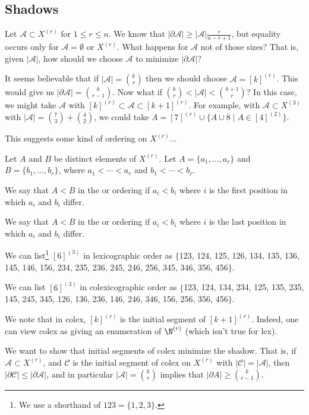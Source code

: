 \documentclass[a4paper]{scrartcl}
\newcommand{\A}{\mathcal{A}}
\begin{document}
\subsection{Shadows}

Let $\A \subset X^{(r)}$ for $1 \leq r \leq n$. We know that $|\partial \A| \geq |\A| \frac{r}{n - r + 1}$, but equality occurs only for $\A = \emptyset$ or $X^{(r)}$. What happens for $\A$ not of those sizes? That is, given $|\A|$, how should we choose $\A$ to minimize $|\partial \A|$?

It seems believable that if $|\A| = \binom{k}{r}$ then we should choose $\A = [k]^{(r)}$. This would give us $|\partial \A| = \binom{k}{r - 1}$. Now what if $\binom{k}{r} < |\A| < \binom{k + 1}{r}$? In this case, we might take $\A$ with $[k]^{(r)} \subset \A \subset [k+1]^{(r)}$. For example, with $\A \subset X^{(3)}$ with $|\A| = \binom{7}{3} + \binom{4}{2}$, we could take $A = [7]^{(r)} \cup \{A \cup 8 \mid A \in [4]^{(2)}\}$.

This suggests some kind of ordering on $X^{(r)}$...

\begin{definition}[Ordering $X^{(r)}$]
    Let $A$ and $B$ be distinct elements of $X^{(r)}$. Let $A = \{a_1, \dots, a_r\}$ and $B = \{b_1, \dots, b_r\}$, where $a_1 < \cdots < a_r$ and $b_1 < \cdots < b_r$.

    We say that $A < B$ in the  or  ordering if 
    $a_i < b_i$ where $i$ is the first position in which $a_i$ and $b_i$ differ.

    We say that $A < B$ in the  or  ordering if $a_i < b_i$ where $i$ is the last position in which $a_i$ and $b_i$ differ.
\end{definition}

\begin{example}
We can list\footnote{We use a shorthand of $123 = \{1, 2, 3\}$.} $[6]^{(3)}$ in lexicographic order as $\{$123, 124, 125, 126, 134, 135, 136, 145, 146, 156, 234, 235, 236, 245, 246, 256, 345, 346, 356, 456$\}$.
\end{example}

\begin{example}
We can list $[6]^{(3)}$ in colexicographic order as $\{$123, 124, 134, 234, 125, 135, 235, 145, 245, 345, 126, 136, 236, 146, 246, 346, 156, 256, 356, 456$\}$.
\end{example}

We note that in colex, $[k]^{(r)}$ is the initial segment of $[k + 1]^{(r)}$. Indeed, one can view colex as giving an enumeration of $\N^{(r)}$ (which isn't true for lex). 

We want to show that initial segments of colex minimize the shadow. That is, if $\A \subset X^{(r)}$, and $\mathcal{C}$ is the initial segment of colex on $X^{(r)}$ with $|\mathcal{C}| = |\A|$, then $|\partial \mathcal{C}| \leq |\partial \mathcal{A}|$, and in particular $|\A| = \binom{k}{r}$ implies that $|\partial A| \geq \binom{k}{r - 1}$.
\end{document}
